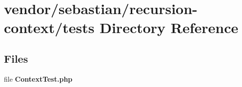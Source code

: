 \section{vendor/sebastian/recursion-\/context/tests Directory Reference}
\label{dir_9ce1f9604d5fc6b6274f8681f21a6ed6}
\subsection*{Files}
\begin{DoxyCompactItemize}
\item 
file {\bf Context\+Test.\+php}
\end{DoxyCompactItemize}
